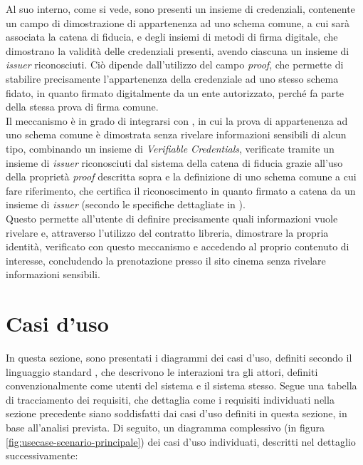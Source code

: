 Al suo interno, come si vede, sono presenti un insieme di credenziali, contenente un campo di dimostrazione di appartenenza ad uno schema comune,
a cui sarà associata la catena di fiducia, e degli insiemi di metodi di firma digitale, che dimostrano la validità delle credenziali presenti,
avendo ciascuna un insieme di \textit{issuer} riconosciuti. Ciò dipende dall'utilizzo del campo \textit{proof}, che permette di stabilire precisamente
l'appartenenza della credenziale ad uno stesso schema fidato, in quanto firmato digitalmente da un ente autorizzato, perché fa parte della stessa prova di firma 
comune. \\

Il meccanismo è in grado di integrarsi con , in cui la prova di appartenenza ad uno schema comune è dimostrata
senza rivelare informazioni sensibili di alcun tipo, combinando un insieme di \textit{Verifiable Credentials}, verificate tramite 
un insieme di \textit{issuer} riconosciuti dal sistema della catena di fiducia grazie all'uso della proprietà \textit{proof} descritta sopra
e la definizione di uno schema comune a cui fare riferimento, che certifica il riconoscimento in quanto firmato a catena da un insieme di \textit{issuer}
(secondo le specifiche dettagliate in \cite{site:zkpw3c}). \\
Questo permette all'utente di definire precisamente quali informazioni vuole rivelare e, attraverso l'utilizzo del contratto libreria, 
dimostrare la propria identità, verificato con questo meccanismo e accedendo al proprio contenuto di interesse, concludendo la prenotazione 
presso il sito cinema senza rivelare informazioni sensibili. 

\section{Casi d'uso} \label{sec:usecase}

In questa sezione, sono presentati i diagrammi dei casi d'uso, definiti secondo il linguaggio standard ,
che descrivono le interazioni tra gli attori, definiti convenzionalmente come utenti del sistema e il sistema stesso. 
Segue una tabella di tracciamento dei requisiti, che dettaglia come i requisiti individuati nella sezione precedente siano soddisfatti
dai casi d'uso definiti in questa sezione, in base all'analisi prevista. 
Di seguito, un diagramma complessivo (in figura \ref{fig:usecase-scenario-principale}) dei casi d'uso individuati, descritti nel dettaglio successivamente: \\

